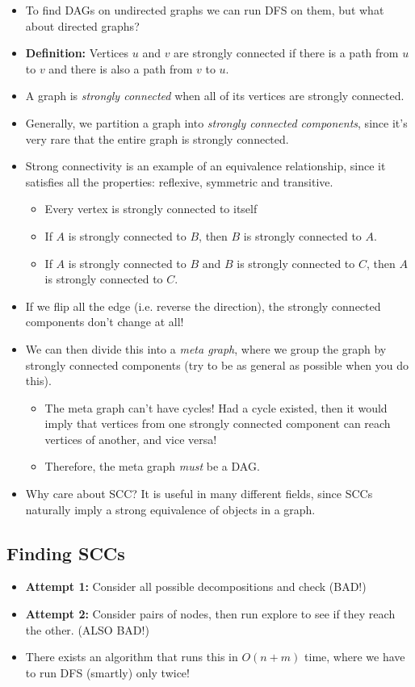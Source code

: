 \documentclass[10pt]{article}
\begin{document}
	\begin{itemize}
		\item To find DAGs on undirected graphs we can run DFS on them, but what about directed graphs? 
		\item \textbf{Definition:} Vertices $u$ and $v$ are strongly connected if there is a path from $u$ to 
			$v$ and there is also a path from $v$ to $u$. 
		\item A graph is \textit{strongly connected} when all of its vertices are strongly connected.
		\item Generally, we partition a graph into \textit{strongly connected components}, since it's very rare
			that the 
			entire graph is strongly connected.
		\item Strong connectivity is an example of an equivalence relationship, since it satisfies all 
			the properties: reflexive, symmetric and transitive.
			\begin{itemize}
				\item Every vertex is strongly connected to itself
				\item If $A$ is strongly connected to $B$, then $B$ is strongly connected to $A$. 
				\item If $A$ is strongly connected to $B$ and $B$ is strongly connected to $C$, then $A$ 
					is strongly connected to $C$.
			\end{itemize}
		\item If we flip all the edge (i.e. reverse the direction), the strongly connected components don't 
			change at all! 
		\item We can then divide this into a \textit{meta graph}, where we group the graph by strongly 
			connected components (try to be as general as possible when you do this).
			\begin{itemize}
				\item The meta graph can't have cycles! Had a cycle existed, then it would imply that vertices 
					from one strongly connected component can reach vertices of another, and vice versa!
				\item Therefore, the meta graph \textit{must} be a DAG.
			\end{itemize}
		\item Why care about SCC? It is useful in many different fields, since SCCs naturally imply 
			a strong equivalence of objects in a graph.
	\end{itemize}
	\subsection{Finding SCCs}
	\begin{itemize}
		\item \textbf{Attempt 1:} Consider all possible decompositions and check (BAD!)
		\item \textbf{Attempt 2:} Consider pairs of nodes, then run explore to see if they reach the other. 
			(ALSO BAD!)
		\item There exists an algorithm that runs this in $O(n + m)$ time, where we have to run DFS (smartly) 
			only twice!
	\end{itemize}
\end{document}
